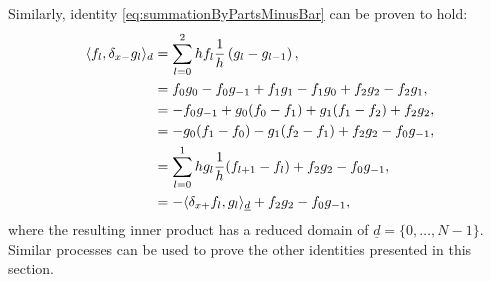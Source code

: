 Similarly, identity \eqref{eq:summationByPartsMinusBar} can be proven to hold:
\begin{align*}
    \langle f_l, \delta_{x-} g_l \rangle_d &= \sum_{l = 0}^2 h f_l\frac{1}{h}\left(g_l - g_{l-1}\right),\\
    &= f_0g_0 - f_0g_{-1} + f_1g_1 - f_1g_0 + f_2g_2-f_2g_1,\\
    &= -f_0g_{-1} + g_0(f_0-f_1) + g_1(f_1-f_2) + f_2g_2,\\
    &= - g_0(f_1 - f_0) - g_1(f_2-f_1) + f_2g_2 - f_0g_{-1},\\
    &=\sum_{l=0}^1hg_l\frac{1}{h}(f_{l+1}-f_l) + f_2g_2 - f_0g_{-1},\\
    &= -\langle \delta_{x+} f_l, g_l\rangle_{\underline{d}} + f_2g_2 - f_0g_{-1},
\end{align*}
where the resulting inner product has a reduced domain of $\underline{d} = \{0, \hdots, N-1\}$.
Similar processes can be used to prove the other identities presented in this section.



